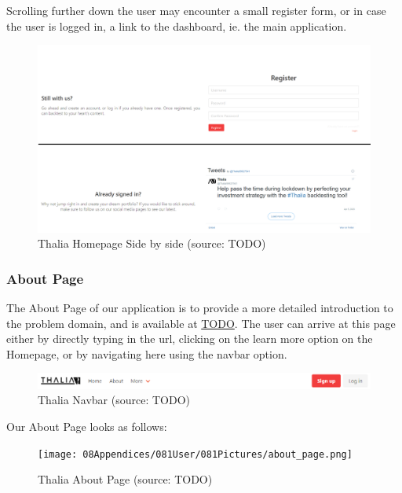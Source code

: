 \documentclass[main.tex]{subfiles}
\begin{document}
Scrolling further down the user may encounter a small register form, or in case the user is logged in, a link to the dashboard, ie. the main application.

\begin{figure}[H]
   \centering
   \includegraphics[width=\textwidth]{08Appendices/081User/081Pictures/homepage_bottom.png}
   \caption{Thalia Homepage Side by side (source: TODO)}
   \label{thalia_home_bottom}
\end{figure}

\subsubsection{About Page}

The About Page of our application is to provide a more detailed introduction to the problem domain, and is available at \url{TODO}.
The user can arrive at this page either by directly typing in the url, clicking on the learn more option on the Homepage, or by navigating here using the navbar option.

\begin{figure}[H]
   \centering
   \includegraphics[width=\textwidth]{08Appendices/081User/081Pictures/navbar.png}
   \caption{Thalia Navbar (source: TODO)}
   \label{thalia_navbar}
\end{figure}

Our About Page looks as follows:

\begin{figure}[H]
   \centering
   \texttt{[image: 08Appendices/081User/081Pictures/about\_page.png]}
   \caption{Thalia About Page (source: TODO)}
   \label{thalia_about}
\end{figure}
\end{document}
